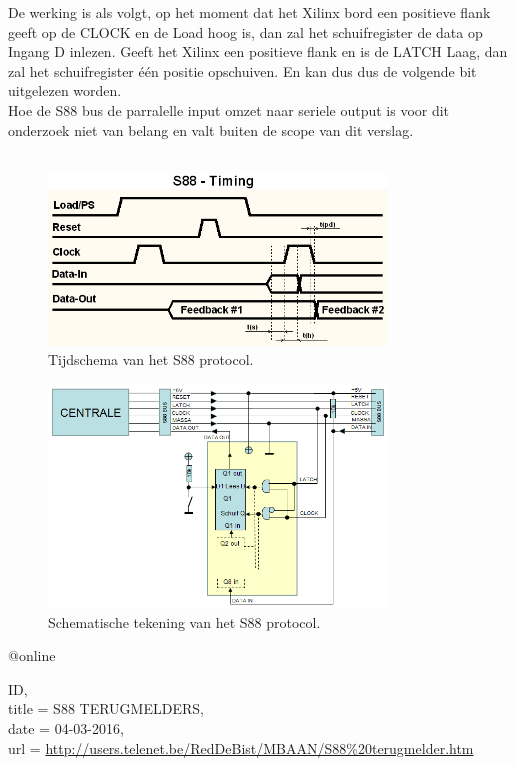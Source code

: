De werking is als volgt, op het moment dat het Xilinx bord een positieve flank geeft op de CLOCK en de Load hoog is, dan zal het schuifregister de data op Ingang D inlezen. Geeft het Xilinx een positieve flank en is de LATCH Laag, dan zal het schuifregister één positie opschuiven. En kan dus dus de volgende bit uitgelezen worden.\\
Hoe de S88 bus de parralelle input omzet naar seriele output is voor dit onderzoek niet van belang en valt buiten de scope van dit verslag.	
\\ 
\\
\begin{figure}[h]
	\begin{center}
		\includegraphics[width=0.8\textwidth]{./img/S88Timing.png}
		\caption{Tijdschema van het S88 protocol.}
		\label{figlabel}
	\end{center}
\end{figure}
\begin{figure}[h]
	\begin{center}
		\includegraphics[width=0.8\textwidth]{./img/S88Bus.png}
		\caption{Schematische tekening van het S88 protocol.}
		\label{figlabel}
	\end{center}
\end{figure}


@online{ID,\\
	title = {S88 TERUGMELDERS},\\
	date = {04-03-2016},\\
	url = \url{http://users.telenet.be/RedDeBist/MBAAN/S88\%20terugmelder.htm}
		
	}
	
